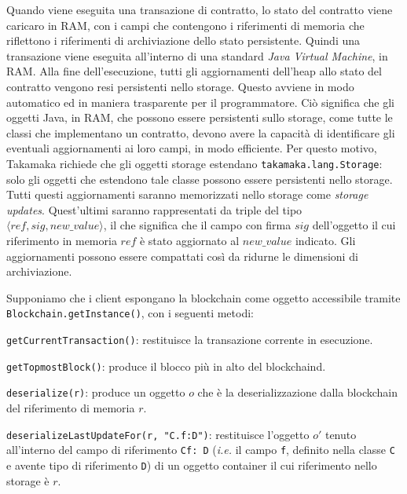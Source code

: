 Quando viene eseguita una transazione di contratto, lo stato del contratto viene caricaro in RAM, con i campi che contengono i riferimenti di memoria che riflettono i riferimenti di archiviazione dello stato persistente. Quindi una transazione viene eseguita all'interno di una standard \textit{Java Virtual Machine}, in RAM. Alla fine dell'esecuzione, tutti gli aggiornamenti dell'heap allo stato del contratto vengono resi persistenti nello storage. Questo avviene in modo automatico ed in maniera trasparente per il programmatore. Ciò significa che gli oggetti Java, in RAM, che possono essere persistenti sullo storage, come tutte le classi che implementano un contratto, devono avere la capacità di identificare gli eventuali aggiornamenti ai loro campi, in modo efficiente. Per questo motivo, Takamaka richiede che gli oggetti storage estendano \lstinline|takamaka.lang.Storage|: solo gli oggetti che estendono tale classe possono essere persistenti nello storage. Tutti questi aggiornamenti saranno memorizzati nello storage come \textit{storage updates}. Quest'ultimi saranno rappresentati da triple del tipo $\langle ref, sig, new\_value \rangle$, il che significa che il campo con firma $sig$ dell'oggetto il cui riferimento in memoria $ref$ è stato aggiornato al $new\_value$ indicato. Gli aggiornamenti possono essere compattati così da ridurne le dimensioni di archiviazione.

Supponiamo che i client espongano la blockchain come oggetto accessibile tramite \lstinline|Blockchain.getInstance()|, con i seguenti metodi:

\vspace{1ex}
\noindent
\lstinline|getCurrentTransaction()|:
	restituisce la transazione corrente in esecuzione.
	
\vspace{1ex}
\noindent
\lstinline|getTopmostBlock()|:
	produce il blocco più in alto del blockchaind.

\vspace{1ex}
\noindent
\lstinline|deserialize(r)|:
	produce un oggetto $o$ che è la deserializzazione dalla blockchain del riferimento di memoria $r$.
	
\vspace{1ex}
\noindent
\lstinline|deserializeLastUpdateFor(r, "C.f:D")|:
	restituisce l'oggetto $o'$ tenuto all'interno del campo di riferimento \lstinline|Cf: D| (\textit{i.e.} il campo \lstinline|f|, definito nella classe \lstinline|C| e avente tipo di riferimento \lstinline|D|) di un oggetto container il cui riferimento nello storage è $r$.
	
